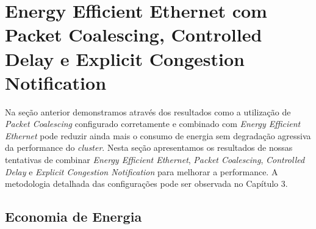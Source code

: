 \section{Energy Efficient Ethernet com Packet Coalescing, Controlled Delay e Explicit Congestion Notification}

Na seção anterior demonstramos através dos resultados como a utilização de \emph{Packet Coalescing} configurado corretamente e combinado com \emph{Energy Efficient Ethernet} pode reduzir ainda mais o consumo de energia sem degradação agressiva da performance do \emph{cluster}. Nesta seção apresentamos os resultados de nossas tentativas de combinar \emph{Energy Efficient Ethernet}, \emph{Packet Coalescing}, \emph{Controlled Delay} e \emph{Explicit Congestion Notification} para melhorar a performance. A metodologia detalhada das configurações pode ser observada no Capítulo 3.


\subsection{Economia de Energia}


